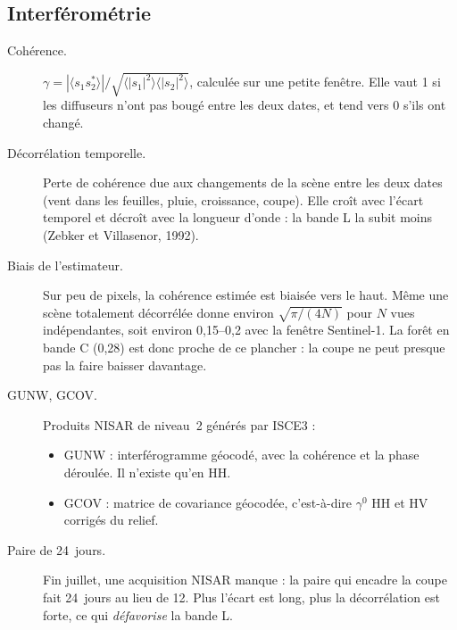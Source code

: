 \documentclass[11pt,a4paper]{article}
\begin{document}
\subsection{Interférométrie}
\begin{description}
\item[Cohérence.] $\gamma=|\langle s_1 s_2^*\rangle|/\sqrt{\langle|s_1|^2\rangle\langle|s_2|^2\rangle}$, calculée sur
  une petite fenêtre. Elle vaut 1 si les diffuseurs n'ont pas bougé entre les deux dates, et tend vers 0 s'ils ont
  changé.
\item[Décorrélation temporelle.] Perte de cohérence due aux changements de la scène entre les deux dates (vent dans
  les feuilles, pluie, croissance, coupe). Elle croît avec l'écart temporel et décroît avec la longueur d'onde : la
  bande L la subit moins (Zebker et Villasenor, 1992).
\item[Biais de l'estimateur.] Sur peu de pixels, la cohérence estimée est biaisée vers le haut. Même une scène
  totalement décorrélée donne environ $\sqrt{\pi/(4N)}$ pour $N$ vues indépendantes, soit environ 0,15--0,2 avec la
  fenêtre Sentinel-1. La forêt en bande C (0,28) est donc proche de ce plancher : la coupe ne peut presque pas la
  faire baisser davantage.
\item[GUNW, GCOV.] Produits NISAR de niveau~2 générés par ISCE3 :
  \begin{itemize}
  \item GUNW : interférogramme géocodé, avec la cohérence et la phase déroulée. Il n'existe qu'en HH.
  \item GCOV : matrice de covariance géocodée, c'est-à-dire $\gamma^0$ HH et HV corrigés du relief.
  \end{itemize}
\item[Paire de 24~jours.] Fin juillet, une acquisition NISAR manque : la paire qui encadre la coupe fait 24~jours
  au lieu de 12. Plus l'écart est long, plus la décorrélation est forte, ce qui \emph{défavorise} la bande L.
\end{description}
\end{document}
